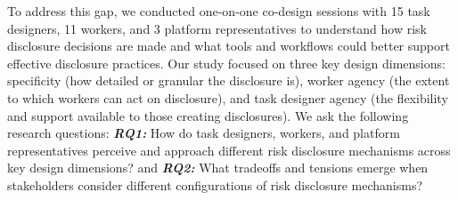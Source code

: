 

To address this gap, we conducted one-on-one co-design sessions \cite{tang2024ai,kuo2023understanding} with 15 task designers, 11 workers, and 3 platform representatives to understand how risk disclosure decisions are made and what tools and workflows could better support effective disclosure practices. Our study focused on three key design dimensions: specificity (how detailed or granular the disclosure is), worker agency (the extent to which workers can act on disclosure), and task designer agency (the flexibility and support available to those creating disclosures). We ask the following research questions:\textbf{\textit{ RQ1:}} How do task designers, workers, and platform representatives perceive and approach different risk disclosure mechanisms across key design dimensions? and \textbf{\textit{RQ2: }}What tradeoffs and tensions emerge when stakeholders consider different configurations of risk disclosure mechanisms?  


